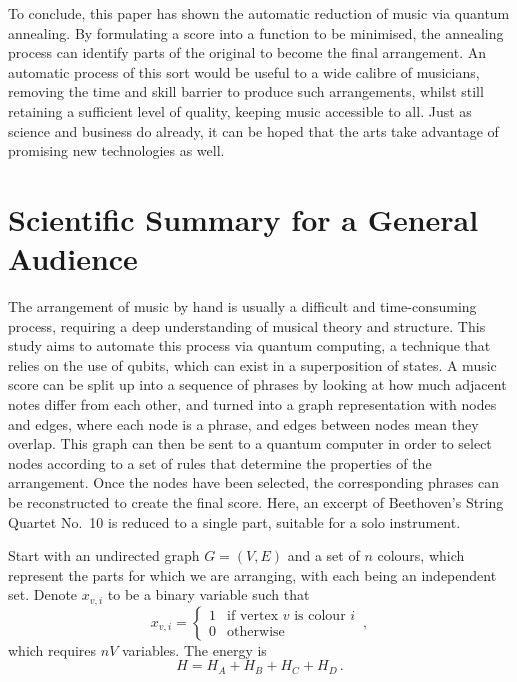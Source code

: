 \documentclass[aps,pra,12pt,onecolumn]{revtex4-2}
\begin{document}
To conclude, this paper has shown the automatic reduction of music via quantum annealing. By formulating a score into a function to be minimised, the annealing process can identify parts of the original to become the final arrangement. An automatic process of this sort would be useful to a wide calibre of musicians, removing the time and skill barrier to produce such arrangements, whilst still retaining a sufficient level of quality, keeping music accessible to all. Just as science and business do already, it can be hoped that the arts take advantage of promising new technologies as well.

\nocite{*}


\clearpage

\section*{Scientific Summary for a General Audience} %

The arrangement of music by hand is usually a difficult and time-consuming process, requiring a deep understanding of musical theory and structure. This study aims to automate this process via quantum computing, a technique that relies on the use of qubits, which can exist in a superposition of states. A music score can be split up into a sequence of phrases by looking at how much adjacent notes differ from each other, and turned into a graph representation with nodes and edges, where each node is a phrase, and edges between nodes mean they overlap. This graph can then be sent to a quantum computer in order to select nodes according to a set of rules that determine the properties of the arrangement. Once the nodes have been selected, the corresponding phrases can be reconstructed to create the final score. Here, an excerpt of Beethoven's String Quartet No.\ 10 is reduced to a single part, suitable for a solo instrument.

\clearpage

Start with an undirected graph $G=(V,E)$ and a set of $n$ colours, which represent the parts for which we are arranging, with each being an independent set. Denote $x_{v,i}$ to be a binary variable such that
\begin{equation*}
    x_{v,i} =
    \begin{cases}
        1 & \text{if vertex $v$ is colour $i$} \\
        0 & \text{otherwise}
    \end{cases}
    \,,
\end{equation*}
which requires $nV$ variables. The energy is
\begin{equation*}
    H = H_A + H_B + H_C + H_D \,.
\end{equation*}
\end{document}
